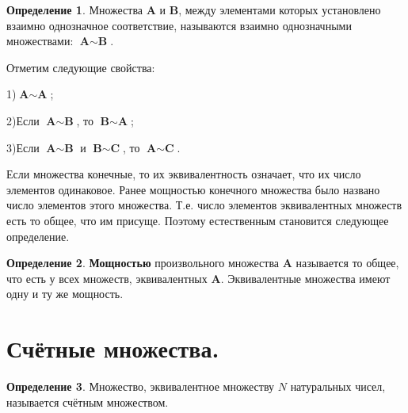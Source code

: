 \documentclass[12pt, a4paper, oneside]{article}
\theoremstyle{plain} %
\theoremstyle{definition}
\newtheorem*{definition}{Определение}  %
\newcommand{\indef}[1]{\textbf{ \color{dark_red} #1}}
\begin{document}
\begin{definition}
Множества \textbf{A} и \textbf{B}, между элементами которых установлено взаимно однозначное соответствие, называются взаимно однозначными множествами: $\textbf{A} \sim \textbf{B}$. 
\end{definition}

Отметим следующие свойства: 


1)$\textbf{A} \sim \textbf{A}$;


2)Если $\textbf{A} \sim \textbf{B}$, то $\textbf{B} \sim \textbf{A}$;

3)Если $\textbf{A} \sim \textbf{B}$ и $\textbf{B} \sim \textbf{C}$, то $\textbf{A} \sim \textbf{C}$.\par 

Если множества конечные, то их эквивалентность означает, что их число элементов одинаковое. Ранее мощностью конечного множества было названо число элементов этого множества. Т.е. число элементов эквивалентных множеств есть то общее, что им присуще. Поэтому естественным становится следующее определение.

\begin{definition}
\indef{Мощностью} произвольного множества \textbf{A} называется то общее, что есть у всех множеств, эквивалентных \textbf{A}. Эквивалентные множества имеют одну и ту же мощность.
\end{definition}

\section{Счётные множества.}

\begin{definition}
Множество, эквивалентное множеству $N$ натуральных чисел, называется счётным множеством.
\end{definition}
\end{document}
